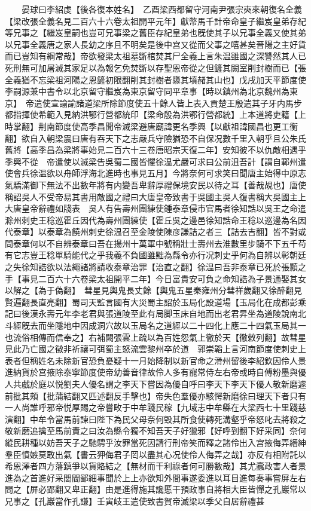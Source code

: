 　　晏球曰李紹虔【後各復本姓名】　乙酉梁西都留守河南尹張宗奭來朝復名全義【梁改張全義名見二百六十六卷太祖開平元年】獻幣馬千計帝命皇子繼岌皇弟存紀等兄事之【繼岌皇嗣也豈可兄事梁之舊臣存紀皇弟也旣使其子以兄事全義又使其弟以兄事全義唐之家人長幼之序且不明矣是後中宫又從而父事之嘻甚矣晉陽之主好貨而已豈知有綱常哉】帝欲發梁太祖墓斲棺焚其尸全義上言朱温雖國之深讐然其人已死刑無可加屠滅其家足以為報乞免焚斲以存聖恩帝從之但鏟其闕室削封樹而已【張全義猶不忘梁祖河陽之恩鏟初限翻削其封樹者隳其墳赭其山也】戊戌加天平節度使李嗣源兼中書令以北京留守繼岌為東京留守同平章事【時以鎮州為北京魏州為東京】　帝遣使宣諭諭諸道梁所除節度使五十餘人皆上表入貢楚王殷遣其子牙内馬步都指揮使希範入見納洪鄂行營都統印【梁命殷為洪鄂行營都統】上本道將吏籍【上時掌翻】荆南節度使高季昌聞帝滅梁避唐廟諱更名季興【以獻祖諱國昌也更工衡翻】欲自入朝梁震曰唐有吞天下之志嚴兵守險猶恐不自保况數千里入朝乎且公朱氏舊將【高季昌為梁將事始見二百六十三卷唐昭宗天復二年】安知彼不以仇敵相遇乎季興不從　帝遣使以滅梁告吳蜀二國皆懼徐温尤嚴可求曰公前沮吾計【謂自鄆州遣使會兵徐温欲以舟師浮海北進時也事見五月】今將奈何可求笑曰聞唐主始得中原志氣驕滿御下無法不出數年將有内變吾卑辭厚禮保境安民以待之耳【善哉覘也】唐使稱詔吳人不受帝易其書用敵國之禮曰大唐皇帝致書于吳國主吳人復書稱大吳國主上大唐皇帝辭禮如牋表　吳人有告壽州團練使鍾泰章侵市官馬者徐知誥以吳王之命遣滁州刺史王稔巡霍丘因代為壽州團練使【霍丘吳之邊邑徐知誥命王稔以巡邊為名因代泰章】以泰章為饒州刺史徐温召至金陵使陳彦謙詰之者三【詰去吉翻】皆不對或問泰章何以不自辨泰章曰吾在揚州十萬軍中號稱壯士壽州去淮數里步騎不下五千苟有它志豈王稔單騎能代之乎我義不負國雖黜為縣令亦行况刺史乎何為自辨以彰朝廷之失徐知誥欲以法繩諸將請收泰章治罪【治直之翻】徐温曰吾非泰章已死於張顥之手【事見二百六十六卷梁太祖開平二年】今日富貴安可負之命知誥為子景通娶其女以解之【為于偽翻】　彗星見輿鬼長丈餘【輿鬼五星秦雍州分彗祥歲翻又徐醉翻見賢遍翻長直亮翻】蜀司天監言國有大災蜀主詔於玉局化設道場【玉局化在成都彭乘記曰後漢永壽元年李老君與張道陵至此有局脚玉床自地而出老君昇坐為道陵說南北斗經旣去而坐隱地中因成洞穴故以玉局名之道經以二十四化上應二十四氣玉局其一也流俗相傳而信奉之】右補闕張雲上疏以為百姓怨氣上徹於天【徹敕列翻】故彗星見此乃亡國之徵非祈禳可弭蜀主怒流雲黎州卒於道　郭崇韜上言河南節度使刺史上表者但稱姓名未除新官恐負憂疑十一月始降制以新官命之滑州留後李紹欽因伶人景進納貨於宫掖除泰寧節度使帝幼善音律故伶人多有寵常侍左右帝或時自傅粉墨與優人共戲於庭以悦劉夫人優名謂之李天下嘗因為優自呼曰李天下李天下優人敬新磨遽前批其頰【批蒲結翻又匹述翻反手擊也】帝失色羣優亦駭愕新磨徐曰理天下者只有一人尚誰呼邪帝悦厚賜之帝嘗畋于中牟踐民稼【九域志中牟縣在大梁西七十里踐慈演翻】中牟令當馬前諫曰陛下為民父母奈何毁其所食使轉死溝壑乎帝怒叱去將殺之敬新磨追擒至馬前責之曰汝為縣令獨不知吾天子好獵邪【好呼到翻下好采同】奈何縱民耕種以妨吾天子之馳騁乎汝罪當死因請行刑帝笑而釋之諸伶出入宫掖侮弄縉紳羣臣憤嫉莫敢出氣【書云狎侮君子罔以盡其心况使伶人侮弄之哉】亦反有相附託以希恩澤者四方藩鎮爭以貨賂結之【無材而干利祿者何可勝數哉】其尤蠧政害人者景進為之首進好采閭閻鄙細事聞於上上亦欲知外間事遂委進以耳目進每奏事嘗屏左右問之【屏必郢翻又卑正翻】由是進得施其讒慝干預政事自將相大臣皆憚之孔巖常以兄事之【孔巖當作孔謙】壬寅岐王遣使致書賀帝滅梁以季父自居辭禮甚

